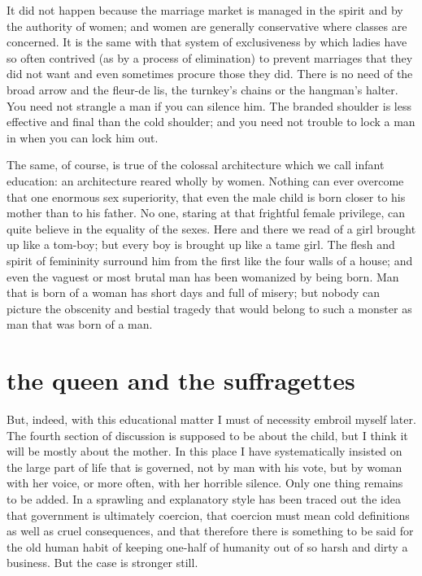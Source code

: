 \documentclass[final,10pt,letterpaper,twocolumn,openany]{book}
\begin{document}
It did not happen because the marriage market
is managed in the spirit and by the authority of women; and women are
generally conservative where classes are concerned. It is the same with
that system of exclusiveness by which ladies have so often contrived (as
by a process of elimination) to prevent marriages that they did not want
and even sometimes procure those they did. There is no need of the broad
arrow and the fleur-de lis, the turnkey's chains or the hangman's halter.
You need not strangle a man if you can silence him. The branded shoulder
is less effective and final than the cold shoulder; and you need not trouble
to lock a man in when you can lock him out.

The same, of course, is true of the colossal architecture which we call
infant education: an architecture reared wholly by women. Nothing can
ever overcome that one enormous sex superiority, that even the male child
is born closer to his mother than to his father. No one, staring at that
frightful female privilege, can quite believe in the equality of the sexes.
Here and there we read of a girl brought up like a tom-boy; but every boy
is brought up like a tame girl. The flesh and spirit of femininity surround
him from the first like the four walls of a house; and even the vaguest or
most brutal man has been womanized by being born. Man that is born of a
woman has short days and full of misery; but nobody can picture the
obscenity and bestial tragedy that would belong to such a monster as man
that was born of a man.

\section{the queen and the suffragettes}

    But, indeed, with this educational matter I must of necessity embroil
myself later. The fourth section of discussion is supposed to be about the
child, but I think it will be mostly about the mother. In this place I have
systematically insisted on the large part of life that is governed, not by
man with his vote, but by woman with her voice, or more often, with her
horrible silence. Only one thing remains to be added. In a sprawling and
explanatory style has been traced out the idea that government is
ultimately coercion, that coercion must mean cold definitions as well as
cruel consequences, and that therefore there is something to be said for the
old human habit of keeping one-half of humanity out of so harsh and dirty
a business. But the case is stronger still.
\end{document}
